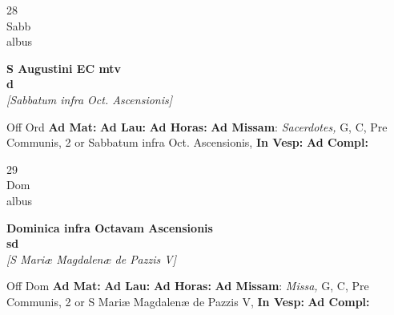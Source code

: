 \documentclass[10pt, openany]{book}
\begin{document}
        \begin{center}
            \begin{minipage}{3.5in}
                \vspace{2em}
                \begin{minipage}{0.5in}
                    {\Huge 28} \\
                    {\normalsize Sabb} \\
                    {\normalsize albus}
                \end{minipage}
                \begin{minipage}{3.0in}
                    \textbf{ \large S Augustini EC mtv \\
                    \textnormal{\normalsize d}} \\ \textit{[Sabbatum infra Oct. Ascensionis]} \\ 
                \end{minipage}
                \begin{justify}Off Ord
                    \textbf{Ad Mat: }
                    \textbf{Ad Lau: }
                    \textbf{Ad Horas: }\textbf{Ad Missam}: \textit{Sacerdotes,} G, C, Pre Communis, 2 or Sabbatum infra Oct. Ascensionis,  
                    \textbf{In Vesp: }
                    \textbf{Ad Compl: }
                \end{justify}
            \end{minipage}
        \end{center}
    
        \begin{center}
            \begin{minipage}{3.5in}
                \vspace{2em}
                \begin{minipage}{0.5in}
                    {\Huge 29} \\
                    {\normalsize Dom} \\
                    {\normalsize albus}
                \end{minipage}
                \begin{minipage}{3.0in}
                    \textbf{ \large Dominica infra Octavam Ascensionis \\
                    \textnormal{\normalsize sd}} \\ \textit{[S Mariæ Magdalenæ de Pazzis V]} \\ 
                \end{minipage}
                \begin{justify}Off Dom
                    \textbf{Ad Mat: }
                    \textbf{Ad Lau: }
                    \textbf{Ad Horas: }\textbf{Ad Missam}: \textit{Missa,} G, C, Pre Communis, 2 or S Mariæ Magdalenæ de Pazzis V,  
                    \textbf{In Vesp: }
                    \textbf{Ad Compl: }
                \end{justify}
            \end{minipage}
        \end{center}
    
\end{document}

